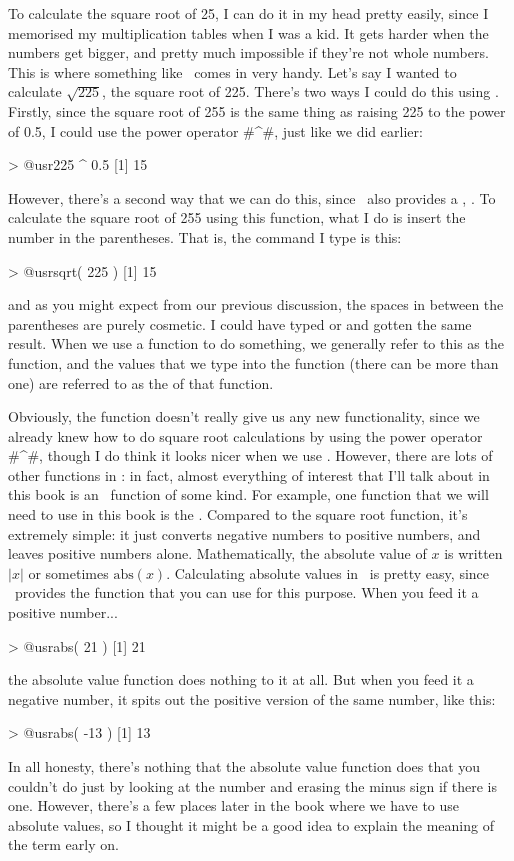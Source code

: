 To calculate the square root of 25, I can do it in my head pretty easily, since I memorised my multiplication tables when I was a kid. It gets harder when the numbers get bigger, and pretty much impossible if they're not whole numbers. This is where something like \R\ comes in very handy. Let's say I wanted to calculate $\sqrt{225}$, the square root of 225. There's two ways I could do this using \R. Firstly, since the square root of 255 is the same thing as raising 225 to the power of 0.5, I could use the power operator \rtextverb#^#, just like we did earlier:
\begin{rblock1}
> @usr{225 ^ 0.5}
[1] 15
\end{rblock1}
However, there's a second way that we can do this, since \R\ also provides a , . To calculate the square root of 255 using this function, what I do is insert the number  in the parentheses. That is, the command I type is this:
\begin{rblock1}
> @usr{sqrt( 225 )}
[1] 15
\end{rblock1}
and as you might expect from our previous discussion, the spaces in between the parentheses are purely cosmetic. I could have typed  or  and gotten the same result. When we use a function to do something, we generally refer to this as  the function, and the values that we type into the function (there can be more than one) are referred to as the  of that function. 

Obviously, the  function doesn't really give us any new functionality, since we already knew how to do square root calculations by using the power operator \rtextverb#^#, though I do think it looks nicer when we use . However, there are lots of other functions in \R: in fact, almost everything of interest that I'll talk about in this book is an \R\ function of some kind. For example, one function that we will need to use in this book is the . Compared to the square root function, it's extremely simple: it just converts negative numbers to positive numbers, and leaves positive numbers alone. Mathematically, the absolute value of $x$ is written $|x|$ or sometimes $\mbox{abs}(x)$. Calculating absolute values in \R\ is pretty easy, since \R\ provides the  function that you can use for this purpose. When you feed it a positive number...
\begin{rblock1}
> @usr{abs( 21 )}
[1] 21
\end{rblock1}
the absolute value function does nothing to it at all. But when you feed it a negative number, it spits out the positive version of the same number, like this:
\begin{rblock1} 
> @usr{abs( -13 )}
[1] 13
\end{rblock1} 
In all honesty, there's nothing that the absolute value function does that you couldn't do just by looking at the number and erasing the minus sign if there is one. However, there's a few places later in the book where we have to use absolute values, so I thought it might be a good idea to explain the meaning of the term early on.


